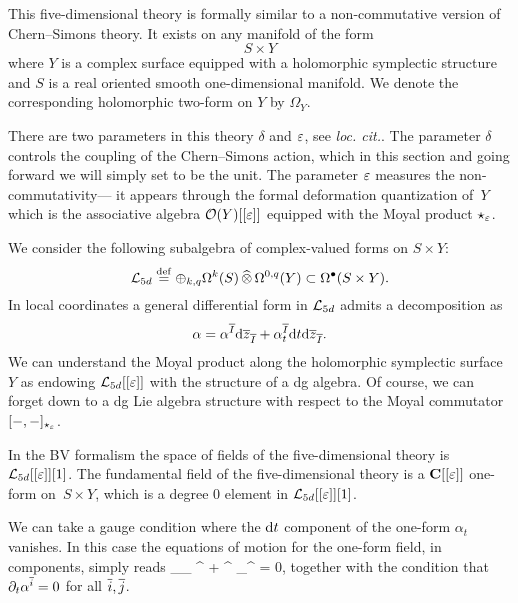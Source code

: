 This five-dimensional theory is formally similar to a non-commutative version of Chern--Simons theory.
It exists on any manifold of the form
\[
  S\times Y
\]
where $Y$ is a complex surface equipped with a holomorphic symplectic structure and $S$ is a real oriented smooth one-dimensional manifold.
We denote the corresponding holomorphic two-form on $Y$ by $\Omega_Y$.

There are two parameters in this theory $\delta$ and $\ep$, see \textit{loc. cit.}.
The parameter $\delta$ controls the coupling of the Chern--Simons action, which in this section and going forward we will simply set to be the unit. 
The parameter $\ep$ measures the non-commutativity---
it appears through the formal deformation quantization of~$Y$ which is the associative algebra $\cO(Y)[[\ep]]$ equipped with the Moyal product $\star_\ep$.

We consider the following subalgebra of complex-valued forms on $S\times Y$:
\[
\cL_{5d} \define \oplus_{k,q}\Omega^{k}(S)\hotimes \Omega^{0,q}(Y) \subset \Omega^\bu(S \times Y) .
\]
In local coordinates a general differential form in $\cL_{5d}$ admits a decomposition as
\[
\alpha = \alpha^{\Bar I} \d \zbar_{\Bar I} + \alpha^{\Bar I}_t \d t \d \zbar_{\Bar I} .
\]
We can understand the Moyal product along the holomorphic symplectic surface $Y$ as endowing $\cL_{5d}[[\ep]]$ with the structure of a dg algebra. 
Of course, we can forget down to a dg Lie algebra structure with respect to the Moyal commutator $[-,-]_{\star_{\ep}}$.

In the BV formalism the space of fields of the five-dimensional theory is $\cL_{5d}[[\ep]] [1]$. 
The fundamental field of the five-dimensional theory is a $\C[[\ep]]$ one-form on~$S \times Y$, which is a degree $0$ element in $\cL_{5d}[[\ep]] [1]$.

We can take a gauge condition where the $\d t$ component of the one-form $\alpha_t$ vanishes.
In this case the equations of motion for the one-form field, in components, simply reads
\beqn
\del_{\zbar_{}} \alpha^{} + \alpha^{} \star_\ep \alpha^{} = 0,
\eeqn
together with the condition that $\del_t \alpha^{\Bar{i}} = 0$ for all $\Bar{i}, \Bar{j}$.

%

